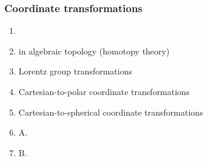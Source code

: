 \documentclass[12pt]{article}
\begin{document}
\subsubsection*{Coordinate transformations}
\begin{enumerate}
\item {} 
\item {} in algebraic topology (homotopy theory)
\item Lorentz group transformations
\item Cartesian-to-polar coordinate transformations
\item Cartesian-to-spherical coordinate transformations
\item A.
\item B.
\end{enumerate}

\end{document}
